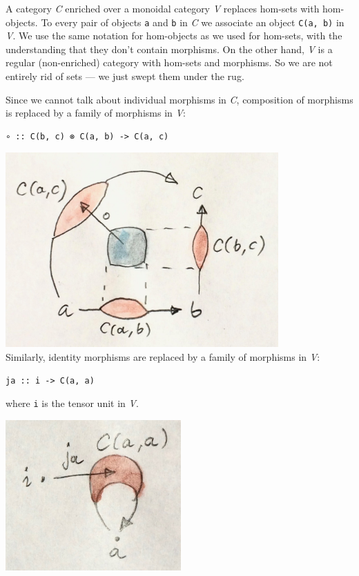 A category \emph{C} enriched over a monoidal category \emph{V} replaces
hom-sets with hom-objects. To every pair of objects \texttt{a} and
\texttt{b} in \emph{C} we associate an object \texttt{C(a,\ b)} in
\emph{V}. We use the same notation for hom-objects as we used for
hom-sets, with the understanding that they don't contain morphisms. On
the other hand, \emph{V} is a regular (non-enriched) category with
hom-sets and morphisms. So we are not entirely rid of sets --- we just
swept them under the rug.

Since we cannot talk about individual morphisms in \emph{C}, composition
of morphisms is replaced by a family of morphisms in \emph{V}:

\begin{verbatim}
∘ :: C(b, c) ⊗ C(a, b) -> C(a, c)
\end{verbatim}

\includegraphics[width=4.11458in]{images/composition.jpg}\\
Similarly, identity morphisms are replaced by a family of morphisms in
\emph{V}:

\begin{verbatim}
ja :: i -> C(a, a)
\end{verbatim}

where \texttt{i} is the tensor unit in \emph{V}.

\includegraphics[width=2.64583in]{images/id.jpg}

